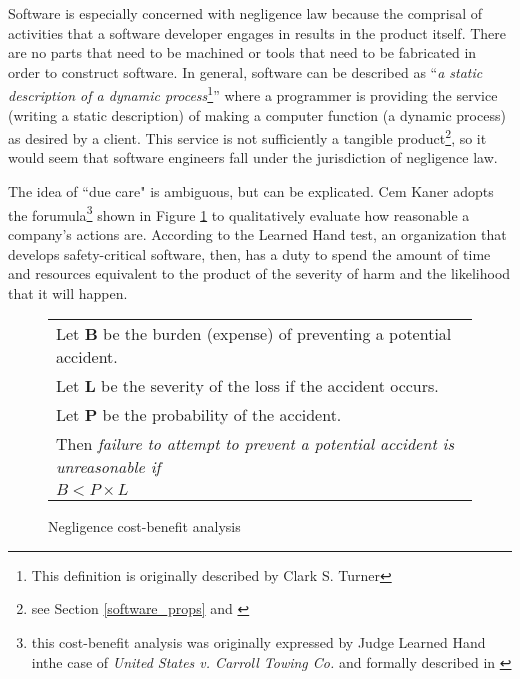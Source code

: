 Software is especially concerned with negligence law because the comprisal of
activities that a software developer engages in results in the product itself.
There are no parts that need to be machined or tools that need to be fabricated
in order to construct software. In general, software can be described as 
``\textit{a static description of a dynamic process}\footnote{This definition
is originally described by Clark S. Turner}'' where a programmer is providing
the service (writing a static description) of making a computer function (a
dynamic process) as desired by a client. This service is not sufficiently a
tangible product\footnote{see Section \ref{software_props} and
\cite{Turner2000}}, so it would seem that software engineers fall under the
jurisdiction of negligence law.

The idea of ``due care" is ambiguous, but can be explicated. Cem Kaner adopts
the forumula\footnote{this cost-benefit analysis was originally expressed by
Judge Learned Hand inthe case of  \textit{United States v. Carroll Towing Co.}
and formally described in \cite{Kaner_neg_1995}} shown in Figure 
\ref{fig:negligence} to qualitatively evaluate how reasonable a company's
actions are. According to the Learned Hand test, an organization that develops 
safety-critical software, then, has a duty to spend the amount of time and
resources equivalent to the product of the severity of harm and the likelihood
that it will happen.

\begin{figure}
\begin{narrow}{-1.5in}{-1.5in}\begin{center}
\begin{tabular}{|l|}
\hline
	Let \textbf{B} be the burden (expense) of preventing a potential accident.\\
	Let \textbf{L} be the severity of the loss if the accident occurs.\\
	Let \textbf{P} be the probability of the accident.\\[6pt]
	Then \textit{failure to attempt to prevent a potential accident is 
	unreasonable if}\\[8pt]

      \centerline{\(B < P \times L\)}
\\[3pt]
\hline
\end{tabular}
\end{center}\end{narrow}
\caption{Negligence cost-benefit analysis}
\label{fig:negligence}
\end{figure}

